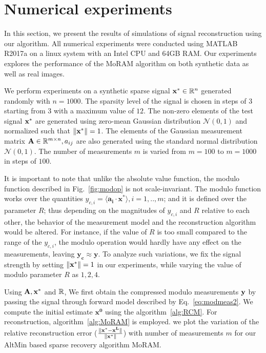 \section{Numerical experiments}
\label{sec:exp}
In this section, we present the results of simulations of signal reconstruction using our algorithm. All numerical experiments were conducted using MATLAB R2017a on a linux system with an Intel CPU and 64GB RAM. Our experiments explores the performance of the MoRAM algorithm on both synthetic data as well as real images.

We perform experiments on a synthetic sparse signal $\mathbf{x^*} \in {\mathbb{R}}^n$ generated randomly with $n=1000$. The sparsity level of the signal is chosen in steps of $3$ starting from $3$ with a maximum value of $12$. The non-zero elements of the test signal $\mathbf{x^*}$ are generated using zero-mean Gaussian distribution $\mathcal{N}(0, 1)$ and normalized such that $\|\mathbf{x^*}\| =1$. The elements of the Gaussian measurement matrix $\mathbf{A} \in {\mathbb{R}}^{m\times n}, a_{ij}$ are also generated using the standard normal distribution $\mathcal{N}(0, 1)$. The number of measurements $m$ is varied from $m = 100$ to $m=1000$ in steps of $100$.  

It is important to note that unlike the absolute value function, the modulo function described in Fig.~\ref{fig:modop} is not scale-invariant. The modulo function works over the quantities $y_{c,i}=\langle \mathbf{a_i} \cdot \mathbf{x^*} \rangle, i=1,..,m$; and it is defined over the parameter $R$; thus depending on the magnitudes of $y_{c,i}$ and $R$ relative to each other, the behavior of the measurement model and the reconstruction algorithm would be altered. For instance, if the value of $R$ is too small compared to the range of the $y_{c,i}$, the modulo operation would hardly have any effect on the measurements, leaving $\mathbf{y_c \approx y}$. To analyze such variations, we fix the signal strength by setting $\|\mathbf{x^*}\| =1$ in our experiments, while varying the value of modulo parameter $R$ as ${1,2,4}$.

Using $\mathbf{A, x^*}$ and ${\mathbb{R}}$, We first obtain the compressed modulo measurements $\mathbf{y}$ by passing the signal through forward model described by Eq.~\ref{eq:modmeas2}. We compute the initial estimate $\mathbf{x^0}$ using the algorithm~\ref{alg:RCM}. For reconstruction, algorithm~\ref{alg:MoRAM} is employed. we plot the variation of the relative reconstruction error ($\frac{\|\mathbf{x^*-x^L}\|}{\|\mathbf{x^*}\|}$) with number of measurements $m$ for our AltMin based sparse recovery algorithm MoRAM.

